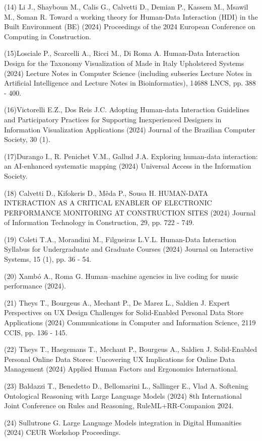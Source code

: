 \documentclass[
	12pt,				%
	oneside,			%
	a4paper,			%
	english,			%
	brazil				%
	]{abntex2ppgsi}
\begin{document}
\begin{apendicesenv}
(14) Li J., Shayboun M., Calis G., Calvetti D., Demian P., Kassem M., Msawil M., Soman R. Toward a working theory for Human-Data Interaction (HDI) in the Built Environment (BE) (2024) Proceedings of the 2024 European Conference on Computing in Construction.

(15)Losciale P., Scarcelli A., Ricci M., Di Roma A. Human-Data Interaction Design for the Taxonomy Visualization of Made in Italy Upholstered Systems (2024) Lecture Notes in Computer Science (including subseries Lecture Notes in Artificial Intelligence and Lecture Notes in Bioinformatics), 14688 LNCS, pp. 388 - 400.

(16)Victorelli E.Z., Dos Reis J.C. Adopting Human-data Interaction Guidelines and Participatory Practices for Supporting Inexperienced Designers in Information Visualization Applications (2024) Journal of the Brazilian Computer Society, 30 (1).

(17)Durango I., R. Penichet V.M., Gallud J.A. Exploring human-data interaction: an AI-enhanced systematic mapping
(2024) Universal Access in the Information Society.

(18) Calvetti D., Kifokeris D., Mêda P., Sousa H. HUMAN-DATA INTERACTION AS A CRITICAL ENABLER OF ELECTRONIC PERFORMANCE MONITORING AT CONSTRUCTION SITES (2024) Journal of Information Technology in Construction, 29, pp. 722 - 749.

(19) Coleti T.A., Morandini M., Filgueiras L.V.L. Human-Data Interaction Syllabus for Undergraduate and Graduate Courses (2024) Journal on Interactive Systems, 15 (1), pp. 36 - 54.

(20) Xambó A., Roma G. Human–machine agencies in live coding for music performance (2024).

(21) Theys T., Bourgeus A., Mechant P., De Marez L., Saldien J. Expert Perspectives on UX Design Challenges for Solid-Enabled Personal Data Store Applications (2024) Communications in Computer and Information Science, 2119 CCIS, pp. 136 - 145.

(22) Theys T., Haegemans T., Mechant P., Bourgeus A., Saldien J. Solid-Enabled Personal Online Data Stores: Uncovering UX Implications for Online Data Management (2024) Applied Human Factors and Ergonomics International.

(23) Baldazzi T., Benedetto D., Bellomarini L., Sallinger E., Vlad A. Softening Ontological Reasoning with Large Language Models (2024) 8th International Joint Conference on Rules and Reasoning, RuleML+RR-Companion 2024.


(24) Sullutrone G. Large Language Models integration in Digital Humanities (2024) CEUR Workshop Proceedings.


\end{apendicesenv}
\end{document}
